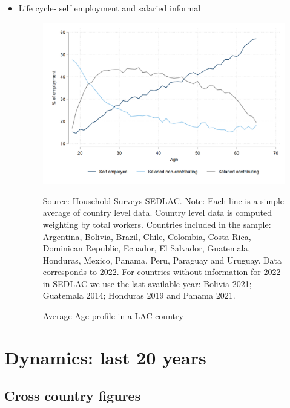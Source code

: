 \documentclass[english]{article}
\begin{document}
\begin{itemize}
    
        \item Life cycle- self employment and salaried informal
             \begin{figure}[H]
                        \justifying
                        \caption{Average Age profile in a LAC country}     
                        \centerline{\includegraphics[scale=.3]{latex/figures/Snapshot/age_profile.png}
                        \label{fig:age_pro}}
                        \footnotesize{Source: Household Surveys-SEDLAC.}
                        \footnotesize{Note: Each line is a simple average of country level data. Country level data is computed weighting by total workers. Countries included in the sample: Argentina, Bolivia, Brazil, Chile, Colombia, Costa Rica, Dominican Republic, Ecuador, El Salvador, Guatemala, Honduras, Mexico, Panama, Peru, Paraguay and Uruguay. Data corresponds to 2022. For countries without information for 2022 in SEDLAC we use the last available year: Bolivia 2021; Guatemala 2014; Honduras 2019 and Panama 2021.}
             \end{figure}
\end{itemize}
        
     
\section{Dynamics: last 20 years}  

\subsection{Cross country figures}
\end{document}
